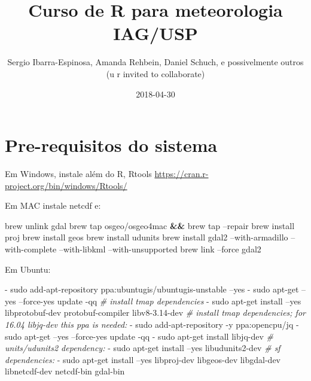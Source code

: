 \documentclass[]{book}
\title{Curso de R para meteorologia IAG/USP}
\author{Sergio Ibarra-Espinosa, Amanda Rehbein, Daniel Schuch, e possivelmente
outros (u r invited to collaborate)}
\date{2018-04-30}
\newenvironment{Shaded}{\begin{snugshade}}{\end{snugshade}}
\newcommand{\KeywordTok}[1]{\textcolor[rgb]{0.13,0.29,0.53}{\textbf{#1}}}
\newcommand{\CommentTok}[1]{\textcolor[rgb]{0.56,0.35,0.01}{\textit{#1}}}
\newcommand{\ExtensionTok}[1]{#1}
\newcommand{\NormalTok}[1]{#1}
\theoremstyle{definition}
\theoremstyle{definition}
\theoremstyle{definition}
\theoremstyle{remark}
\begin{document}
\maketitle

{
\setcounter{tocdepth}{1}
\tableofcontents
}
\chapter{Pre-requisitos do sistema}\label{primero}

Em Windows, instale além do R, Rtools
\url{https://cran.r-project.org/bin/windows/Rtools/}

Em MAC instale netcdf e:

\begin{Shaded}
\begin{Highlighting}[]
\ExtensionTok{brew}\NormalTok{ unlink gdal}
\ExtensionTok{brew}\NormalTok{ tap osgeo/osgeo4mac }\KeywordTok{&&} \ExtensionTok{brew}\NormalTok{ tap --repair}
\ExtensionTok{brew}\NormalTok{ install proj}
\ExtensionTok{brew}\NormalTok{ install geos}
\ExtensionTok{brew}\NormalTok{ install udunits}
\ExtensionTok{brew}\NormalTok{ install gdal2 --with-armadillo --with-complete --with-libkml --with-unsupported}
\ExtensionTok{brew}\NormalTok{ link --force gdal2}
\end{Highlighting}
\end{Shaded}

Em Ubuntu:

\begin{Shaded}
\begin{Highlighting}[]
  \ExtensionTok{-}\NormalTok{ sudo add-apt-repository ppa:ubuntugis/ubuntugis-unstable --yes}
  \ExtensionTok{-}\NormalTok{ sudo apt-get --yes --force-yes update -qq}
  \CommentTok{# install tmap dependencies}
  \ExtensionTok{-}\NormalTok{ sudo apt-get install --yes libprotobuf-dev protobuf-compiler libv8-3.14-dev}
  \CommentTok{# install tmap dependencies; for 16.04 libjq-dev this ppa is needed:}
  \ExtensionTok{-}\NormalTok{ sudo add-apt-repository -y ppa:opencpu/jq}
  \ExtensionTok{-}\NormalTok{ sudo apt-get --yes --force-yes update -qq}
  \ExtensionTok{-}\NormalTok{ sudo apt-get install libjq-dev}
  \CommentTok{# units/udunits2 dependency:}
  \ExtensionTok{-}\NormalTok{ sudo apt-get install --yes libudunits2-dev}
  \CommentTok{# sf dependencies:}
  \ExtensionTok{-}\NormalTok{ sudo apt-get install --yes libproj-dev libgeos-dev libgdal-dev libnetcdf-dev  netcdf-bin gdal-bin}
\end{Highlighting}
\end{Shaded}
\end{document}
